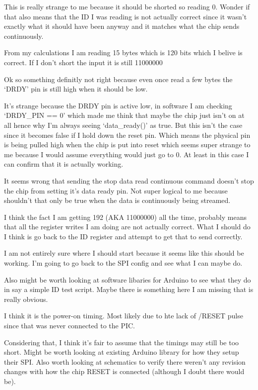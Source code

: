 This is really strange to me because it should be shorted so reading 0.
Wonder if that also means that the ID I was reading is not actually correct since it wasn't
exactly what it should have been anyway and it matches what the chip sends continuously.

From my calculations I am reading 15 bytes which is 120 bits which I belive is correct.
If I don't short the input it is still 11000000

Ok so something definitly not right because even once read a few bytes the `DRDY'
pin is still high when it should be low.

It's strange because the DRDY pin is active low, in software I am checking `DRDY\_PIN == 0'
which made me think that maybe the chip just isn't on at all hence why I'm always seeing
`data\_ready()' as true.
But this isn't the case since it becomes false if I hold down the reset pin.
Which means the physical pin is being pulled high when the chip is put into reset which
seems super strange to me because I would assume everything would just go to 0.
At least in this case I can confirm that it is actually working.

It seems wrong that sending the stop data read continuous command doesn't stop the chip
from setting it's data ready pin. Not super logical to me because shouldn't that only be
true when the data is continuously being streamed.

I think the fact I am getting 192 (AKA 11000000) all the time, probably means that all the
register writes I am doing are not actually correct. What I should do I think is go back
to the ID register and attempt to get that to send correctly.

I am not entirely sure where I should start because it seems like this should be working.
I'm going to go back to the SPI config and see what I can maybe do.

Also might be worth looking at software libaries for Arduino to see what they do in say
a simple ID test script.
Maybe there is something here I am missing that is really obvious.

I think it is the power-on timing. Most likely due to hte lack of /RESET pulse since
that was never connected to the PIC.

Considering that, I think it's fair to assume that the timings may still be too short.
Might be worth looking at existing Arduino library for how they setup their SPI.
Also worth looking at schematics to verify there weren't any revision changes with how
the chip RESET is connected (although I doubt there would be).

